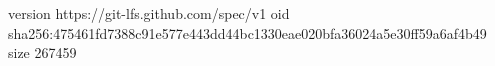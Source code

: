 version https://git-lfs.github.com/spec/v1
oid sha256:475461fd7388c91e577e443dd44bc1330eae020bfa36024a5e30ff59a6af4b49
size 267459

